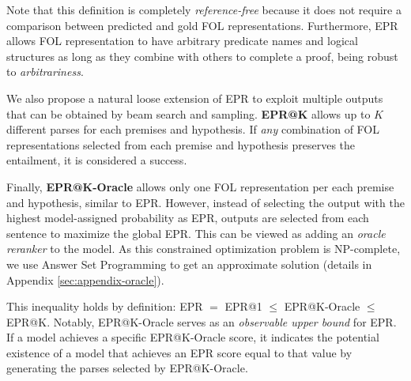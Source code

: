 Note that this definition is completely \textit{reference-free} because it does not require a comparison between predicted and gold FOL representations. Furthermore, EPR allows FOL representation to have arbitrary predicate names and logical structures as long as they combine with others to complete a proof, being robust to \textit{arbitrariness}.

We also propose a natural loose extension of EPR to exploit multiple outputs that can be obtained by beam search and sampling. \textbf{EPR@K} allows up to $K$ different parses for each premises and hypothesis. If \textit{any} combination of FOL representations selected from each premise and hypothesis preserves the entailment, it is considered a success.

Finally, \textbf{EPR@K-Oracle} allows only one FOL representation per each premise and hypothesis, similar to EPR. However, instead of selecting the output with the highest model-assigned probability as EPR, outputs are selected from each sentence to maximize the global EPR. This can be viewed as adding an \textit{oracle reranker} to the model. As this constrained optimization problem is NP-complete, we use Answer Set Programming \citep{asp} to get an approximate solution (details in Appendix \ref{sec:appendix-oracle}).

This inequality holds by definition: EPR $=$ EPR@1 $\leq$ EPR@K-Oracle $\leq$ EPR@K. Notably, EPR@K-Oracle serves as an \textit{observable upper bound} for EPR. If a model achieves a specific EPR@K-Oracle score, it indicates the potential existence of a model that achieves an EPR score equal to that value by generating the parses selected by EPR@K-Oracle.




